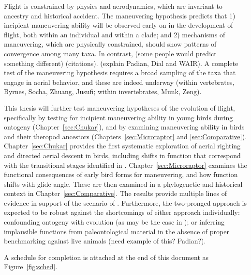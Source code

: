 Flight is constrained by physics and aerodynamics, which are invariant to ancestry and historical accident.  The maneuvering hypothesis predicts that 1) incipient maneuvering ability will be observed early on in the development of flight, both within an individual and within a clade; and 2) mechanisms of maneuvering, which are physically constrained, should show patterns of convergence among many taxa. In contrast, (some people would predict something different) (citations).  (explain Padian, Dial and WAIR).  A complete test of the maneuvering hypothesis requires a broad sampling of the taxa that engage in aerial behavior, and these are indeed underway (within vertebrates, Byrnes, Socha, Zhuang, Jusufi; within invertebrates, Munk, Zeng).
     
This thesis will further test maneuvering hypotheses of the evolution of flight, specifically by testing for incipient maneuvering ability in young birds during ontogeny (Chapter~\ref{sec:Chukar}), and by examining maneuvering ability in birds and their theropod ancestors (Chapters~\ref{sec:Microraptor} and \ref{sec:Comparative}).  Chapter~\ref{sec:Chukar} provides the first systematic exploration of aerial righting and directed aerial descent in birds, including shifts in function that correspond with the transitional stages identified in \citep{Dudley:2011}.  Chapter~\ref{sec:Microraptor} examines the functional consequences of early bird forms for maneuvering, and how function shifts with glide angle.  These are then examined in a phylogenetic and historical context in Chapter~\ref{sec:Comparative}.  The results provide multiple lines of evidence in support of the scenario of \citep{Dudley:2011}.  Furthermore, the two-pronged approach is expected to be robust against the shortcomings of either approach individually:  confounding ontogeny with evolution (as may be the case in \citep{Dial:2003}); or inferring implausible functions from paleontological material in the absence of proper benchmarking against live animals (need example of this? Padian?).

A schedule for completion is attached at the end of this document as Figure~\ref{fig:sched}.


